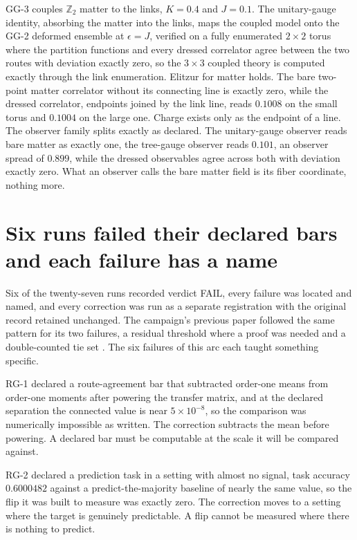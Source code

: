 \documentclass[aps,pre,reprint,nofootinbib,floatfix]{revtex4-2}
\begin{document}
GG-3 couples $\mathbb{Z}_2$ matter to the links, $K=0.4$ and
$J=0.1$.  The unitary-gauge identity, absorbing the matter into the
links, maps the coupled model onto the GG-2 deformed ensemble at
$\epsilon = J$, verified on a fully enumerated $2\times2$ torus
where the partition functions and every dressed correlator agree
between the two routes with deviation exactly zero, so the
$3\times3$ coupled theory is computed exactly through the link
enumeration.  Elitzur for matter holds.  The bare two-point matter
correlator without its connecting line is exactly zero, while the
dressed correlator, endpoints joined by the link line, reads
$0.1008$ on the small torus and $0.1004$ on the large one.  Charge
exists only as the endpoint of a line.  The observer family splits
exactly as declared.  The unitary-gauge observer reads bare matter
as exactly one, the tree-gauge observer reads $0.101$, an observer
spread of $0.899$, while the dressed observables agree across both
with deviation exactly zero.  What an observer calls the bare
matter field is its fiber coordinate, nothing more.

\section{Six runs failed their declared bars and each failure has
a name}
\label{sec:fails}

Six of the twenty-seven runs recorded verdict FAIL, every failure
was located and named, and every correction was run as a separate
registration with the original record retained unchanged.  The
campaign's previous paper followed the same pattern for its two
failures, a residual threshold where a proof was needed and a
double-counted tie set \cite{GamesPaper}.  The six failures of this
arc each taught something specific.

RG-1 declared a route-agreement bar that subtracted order-one means
from order-one moments after powering the transfer matrix, and at
the declared separation the connected value is near
$5\times10^{-8}$, so the comparison was numerically impossible as
written.  The correction subtracts the mean before powering.  A
declared bar must be computable at the scale it will be compared
against.

RG-2 declared a prediction task in a setting with almost no signal,
task accuracy $0.6000482$ against a predict-the-majority baseline
of nearly the same value, so the
flip it was built to measure was exactly zero.  The correction
moves to a setting where the target is genuinely predictable.  A
flip cannot be measured where there is nothing to predict.
\end{document}
